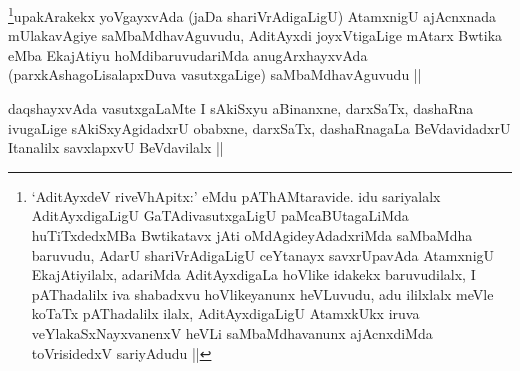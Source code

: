 \begin{artha}
\footnote[1]{`AditAyxdeV riveVhApitx:' eMdu pAThAMtaravide. idu sariyalalx AditAyxdigaLigU GaTAdivasutxgaLigU paMcaBUtagaLiMda huTiTxdedxMBa Bwtikatavx jAti oMdAgideyAdadxriMda saMbaMdha baruvudu, AdarU shariVrAdigaLigU ceYtanayx savxrUpavAda AtamxnigU EkajAtiyilalx, adariMda AditAyxdigaLa hoVlike idakekx baruvudilalx, I pAThadalilx iva shabadxvu hoVlikeyanunx heVLuvudu, adu ililxlalx meVle koTaTx pAThadalilx ilalx, AditAyxdigaLigU AtamxkUkx iruva veYlakaSxNayxvanenxV heVLi saMbaMdhavanunx ajAcnxdiMda toVrisidedxV sariyAdudu ||}upakArakekx yoVgayxvAda (jaDa shariVrAdigaLigU) AtamxnigU ajAcnxnada mUlakavAgiye saMbaMdhavAguvudu, AditAyxdi joyxVtigaLige mAtarx Bwtika eMba EkajAtiyu hoMdibaruvudariMda anugArxhayxvAda (parxkAshagoLisalapxDuva vasutxgaLige) saMbaMdhavAguvudu ||
\end{artha}

\begin{artha}
daqshayxvAda vasutxgaLaMte I sAkiSxyu aBinanxne, darxSaTx, dashaRna ivugaLige sAkiSxyAgidadxrU obabxne, darxSaTx, dashaRnagaLa BeVdavidadxrU Itanalilx savxlapxvU BeVdavilalx ||
\end{artha}

\begin{artha}

\end{artha}

\begin{artha}

\end{artha}

\begin{artha}

\end{artha}

\begin{artha}

\end{artha}

\begin{artha}

\end{artha}

\begin{artha}

\end{artha}

\begin{artha}

\end{artha}

